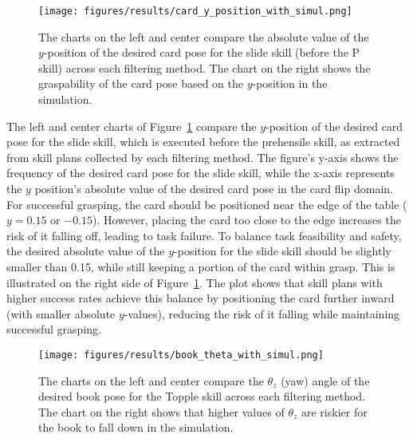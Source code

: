 \begin{figure}[h] %
\centering
\texttt{[image: figures/results/card\_y\_position\_with\_simul.png]}
\caption{The charts on the left and center compare the absolute value of the \(y\)-position of the desired card pose for the slide skill (before the P skill) across each filtering method. The chart on the right shows the graspability of the card pose based on the \(y\)-position in the simulation.} %
\label{fig:card_y_position_histograms} %
\end{figure}

The left and center charts of Figure~\ref{fig:card_y_position_histograms} compare the \(y\)-position of the desired card pose for the slide skill, which is executed before the prehensile skill, as extracted from skill plans collected by each filtering method. The figure's y-axis shows the frequency of the desired card pose for the slide skill, while the x-axis represents the $y$ position's absolute value of the desired card pose in the card flip domain.
For successful grasping, the card should be positioned near the edge of the table (\( y = 0.15 \) or \( -0.15 \)). However, placing the card too close to the edge increases the risk of it falling off, leading to task failure. To balance task feasibility and safety, the desired absolute value of the \( y \)-position for the slide skill should be slightly smaller than 0.15, while still keeping a portion of the card within grasp. This is illustrated on the right side of Figure~\ref{fig:card_y_position_histograms}. The plot shows that skill plans with higher success rates achieve this balance by positioning the card further inward (with smaller absolute \( y \)-values), reducing the risk of it falling while maintaining successful grasping.

\begin{figure}[h] %
\centering
\texttt{[image: figures/results/book\_theta\_with\_simul.png]}
\caption{The charts on the left and center compare the \( \theta_z \) (yaw) angle of the desired book pose for the Topple skill across each filtering method. The chart on the right shows that higher values of \( \theta_z \) are riskier for the book to fall down in the simulation.} %
\label{fig:book_thetay_position_histograms} %
\end{figure}

